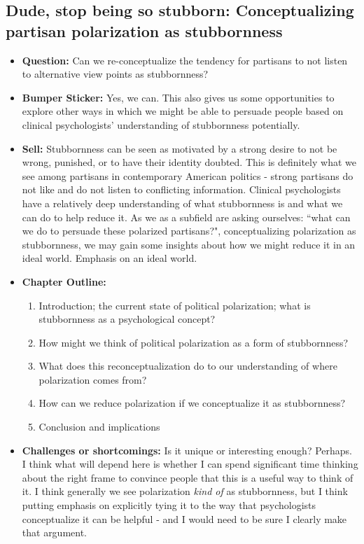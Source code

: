 \documentclass[12pt]{article}
\begin{document}
\subsection{Dude, stop being so stubborn: Conceptualizing partisan polarization as stubbornness}
    \begin{itemize}
        \item \textbf{Question:} Can we re-conceptualize the tendency for partisans to not listen to alternative view points as stubbornness?
        \item \textbf{Bumper Sticker:} Yes, we can. This also gives us some opportunities to explore other ways in which we might be able to persuade people based on clinical psychologists' understanding of stubbornness potentially.
        \item \textbf{Sell:} Stubbornness can be seen as motivated by a strong desire to not be wrong, punished, or to have their identity doubted. This is definitely what we see among partisans in contemporary American politics - strong partisans do not like and do not listen to conflicting information. Clinical psychologists have a relatively deep understanding of what stubbornness is and what we can do to help reduce it. As we as a subfield are asking ourselves: ``what can we do to persuade these polarized partisans?", conceptualizing polarization as stubbornness, we may gain some insights about how we might reduce it in an ideal world. Emphasis on an ideal world.
        \item \textbf{Chapter Outline:}
        \begin{enumerate}
            \item Introduction; the current state of political polarization; what is stubbornness as a psychological concept?
            \item How might we think of political polarization as a form of stubbornness?
            \item What does this reconceptualization do to our understanding of where polarization comes from?
            \item How can we reduce polarization if we conceptualize it as stubbornness?
            \item Conclusion and implications
        \end{enumerate}
        \item \textbf{Challenges or shortcomings:} Is it unique or interesting enough? Perhaps. I think what will depend here is whether I can spend significant time thinking about the right frame to convince people that this is a useful way to think of it. I think generally we see polarization \textit{kind of} as stubbornness, but I think putting emphasis on explicitly tying it to the way that psychologists conceptualize it can be helpful - and I would need to be sure I clearly make that argument.

\end{itemize}
\end{document}
